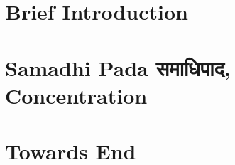 \section[Intro]{Brief Introduction}


\section[Samadhipad]{Samadhi Pada समाधिपाद, Concentration}


\section[End]{Towards End}

